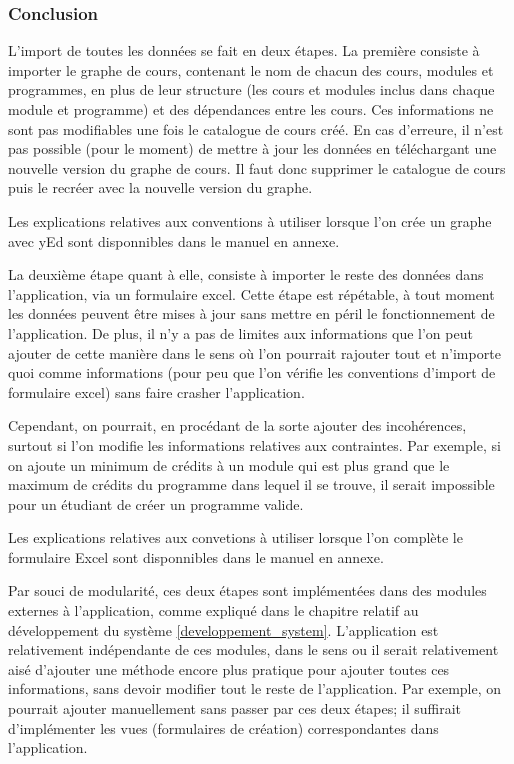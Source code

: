\subsubsection{Conclusion}
L'import de toutes les données se fait en deux étapes. La première consiste à importer le graphe de cours, contenant le nom de chacun des cours, modules et programmes, en plus de leur structure (les cours et modules inclus dans chaque module et programme) et des dépendances entre les cours. Ces informations ne sont pas modifiables une fois le catalogue de cours créé. En cas d'erreure, il n'est pas possible (pour le moment) de mettre à jour les données en téléchargant une nouvelle version du graphe de cours. Il faut donc supprimer le catalogue de cours puis le recréer avec la nouvelle version du graphe.

Les explications relatives aux conventions à utiliser lorsque l'on crée un graphe avec yEd sont disponnibles dans le manuel en annexe.  

La deuxième étape quant à elle, consiste à importer le reste des données dans l'application, via un formulaire excel. Cette étape est répétable, à tout moment les données peuvent être mises à jour sans mettre en péril le fonctionnement de l'application. De plus, il n'y a pas de limites aux informations que l'on peut ajouter de cette manière dans le sens où l'on pourrait rajouter tout et n'importe quoi comme informations (pour peu que l'on vérifie les conventions d'import de formulaire excel) sans faire crasher l'application. 

Cependant, on pourrait, en procédant de la sorte ajouter des incohérences, surtout si l'on modifie les informations relatives aux contraintes. Par exemple, si on ajoute un minimum de crédits à un module qui est plus grand que le maximum de crédits du programme dans lequel il se trouve, il serait impossible pour un étudiant de créer un programme valide.


Les explications relatives aux convetions à utiliser lorsque l'on complète le formulaire Excel sont disponnibles dans le manuel en annexe. 

Par souci de modularité, ces deux étapes sont implémentées dans des modules externes à l'application, comme expliqué dans le chapitre relatif au développement du système \ref{developpement_system}. L'application est relativement indépendante de ces modules, dans le sens ou il serait relativement aisé d'ajouter une méthode encore plus pratique pour ajouter toutes ces informations, sans devoir modifier tout le reste de l'application. Par exemple, on pourrait ajouter manuellement sans passer par ces deux étapes; il suffirait d'implémenter les vues (formulaires de création) correspondantes dans l'application. 




